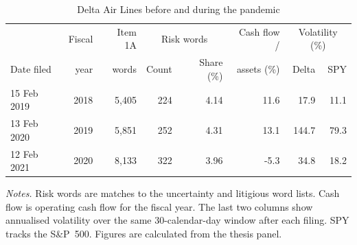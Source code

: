 \begin{table}[htbp]
\centering
\caption{Delta Air Lines before and during the pandemic}
\label{tab:delta_case}
\small
\setlength{\tabcolsep}{4pt}
\begin{tabular}{@{}lrrrrrrr@{}}
\toprule
 & Fiscal & Item 1A & \multicolumn{2}{c}{Risk words} & Cash flow / & \multicolumn{2}{c}{Volatility (\%)} \\
Date filed & year & words & Count & Share (\%) & assets (\%) & Delta & SPY \\
\midrule
15 Feb 2019 & 2018 & 5,405 & 224 & 4.14 & 11.6 & 17.9 & 11.1 \\
13 Feb 2020 & 2019 & 5,851 & 252 & 4.31 & 13.1 & 144.7 & 79.3 \\
12 Feb 2021 & 2020 & 8,133 & 322 & 3.96 & -5.3 & 34.8 & 18.2 \\
\bottomrule
\end{tabular}
\par\smallskip
\begin{minipage}{\linewidth}\footnotesize
\emph{Notes.} Risk words are matches to the uncertainty and litigious word lists. Cash flow is operating cash flow for the fiscal year. The last two columns show annualised volatility over the same 30-calendar-day window after each filing. SPY tracks the S\&P~500. Figures are calculated from the thesis panel.
\end{minipage}
\end{table}
